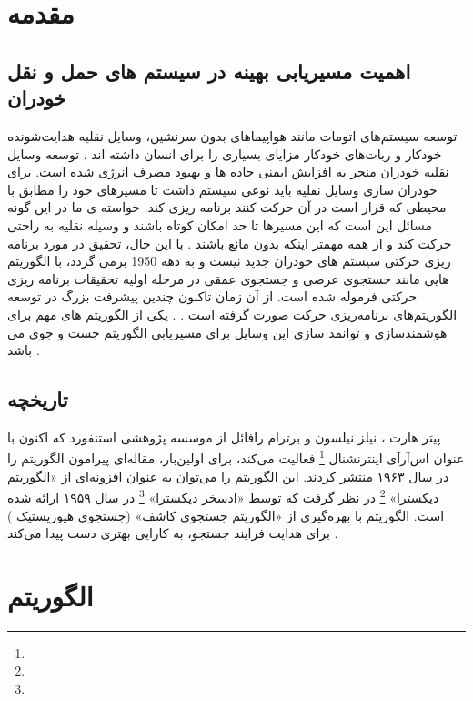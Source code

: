 \chapter{مقدمه}

\section{اهمیت مسیریابی بهینه در سیستم های حمل و نقل خودران}
توسعه سیستم‌های اتومات مانند هواپیماهای بدون سرنشین، وسایل نقلیه هدایت‌شونده خودکار و ربات‌های خودکار مزایای بسیاری را برای انسان داشته اند . توسعه وسایل نقلیه خودران منجر به افزایش ایمنی جاده ها و بهبود مصرف انرژی شده است. برای خودران سازی وسایل نقلیه باید نوعی سیستم داشت تا مسیرهای خود را مطابق با محیطی که قرار است در آن حرکت کنند برنامه ریزی کند. خواسته ی ما در این گونه مسائل این است که  این مسیرها تا حد امکان کوتاه باشند و وسیله نقلیه به راحتی حرکت کند و از همه مهمتر اینکه بدون مانع باشند .
با این حال، تحقیق در مورد برنامه ریزی حرکتی سیستم های خودران جدید نیست و به دهه 1950 برمی گردد، با الگوریتم هایی مانند جستجوی عرضی و جستجوی عمقی در مرحله اولیه تحقیقات برنامه ریزی حرکتی فرموله شده است. از آن زمان تاکنون چندین پیشرفت بزرگ در توسعه الگوریتم‌های برنامه‌ریزی حرکت صورت گرفته است . 
\cite{paliwal2023survey}
. یکی از الگوریتم های مهم برای هوشمندسازی و توانمد سازی این وسایل برای مسیریابی الگوریتم جست و جوی 
می باشد .
\section{تاریخچه}
پیتر هارت 
، نیلز نیلسون 
و برترام رافائل 
از موسسه پژوهشی استنفورد 
که اکنون با عنوان اس‌آرآی اینترنشنال 
\footnote{} 
فعالیت می‌کند، برای اولین‌بار، مقاله‌ای پیرامون الگوریتم
را در سال ۱۹۶۳ منتشر کردند. این الگوریتم را می‌توان به عنوان افزونه‌ای از «الگوریتم دیکسترا» 
\footnote{}
در نظر گرفت که توسط «ادسخر دیکسترا»
\footnote{}
در سال ۱۹۵۹ ارائه شده است. الگوریتم 
با بهره‌گیری از «الگوریتم جستجوی کاشف» (جستجوی هیوریستیک  
) 
برای هدایت فرایند جستجو، به کارایی بهتری دست پیدا می‌کند
\cite{ELhamalgoritma_star}
.
\chapter{الگوریتم }
